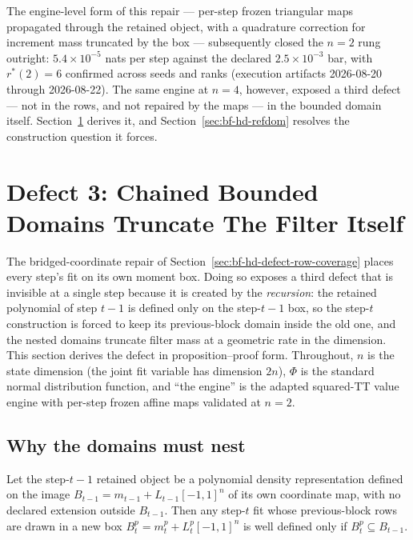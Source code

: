 The engine-level form of this repair --- per-step frozen triangular maps
propagated through the retained object, with a quadrature correction for
increment mass truncated by the box --- subsequently closed the \(n=2\)
rung outright: \(5.4\times10^{-5}\) nats per step against the declared
\(2.5\times10^{-3}\) bar, with \(r^{*}(2)=6\) confirmed across seeds and
ranks (execution artifacts 2026-08-20 through 2026-08-22).  The same
engine at \(n=4\), however, exposed a third defect --- not in the rows,
and not repaired by the maps --- in the bounded domain itself.
Section~\ref{sec:bf-hd-defect-containment} derives it, and
Section~\ref{sec:bf-hd-refdom} resolves the construction question it
forces.

\section[Chained-Domain Truncation]{Defect 3: Chained Bounded Domains Truncate The Filter Itself}
\label{sec:bf-hd-defect-containment}

The bridged-coordinate repair of
Section~\ref{sec:bf-hd-defect-row-coverage} places every step's fit on
its own moment box.  Doing so exposes a third defect that is invisible at
a single step because it is created by the \emph{recursion}: the retained
polynomial of step \(t-1\) is defined only on the step-\(t-1\) box, so
the step-\(t\) construction is forced to keep its previous-block domain
inside the old one, and the nested domains truncate filter mass at a
geometric rate in the dimension.  This section derives the defect in
proposition--proof form.  Throughout, \(n\) is the state dimension (the
joint fit variable has dimension \(2n\)), \(\Phi\) is the standard normal
distribution function, and ``the engine'' is the adapted squared-TT value
engine with per-step frozen affine maps validated at \(n=2\).

\subsection{Why the domains must nest}

\begin{lemma}
\label{lem:bf-hd-containment-nesting}
Let the step-\(t-1\) retained object be a polynomial density
representation defined on the image \(B_{t-1}=m_{t-1}+L_{t-1}[-1,1]^n\)
of its own coordinate map, with no declared extension outside
\(B_{t-1}\).  Then any step-\(t\) fit whose previous-block rows are drawn
in a new box \(B^{p}_{t}=m^{p}_{t}+L^{p}_{t}[-1,1]^n\) is well defined
only if \(B^{p}_{t}\subseteq B_{t-1}\).
\end{lemma}

